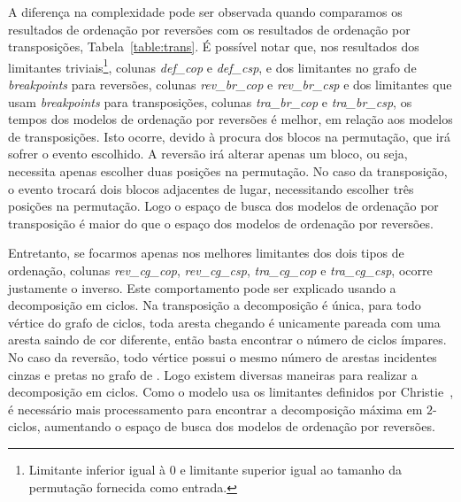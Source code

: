 A diferença na complexidade pode ser observada quando comparamos os
resultados de ordenação por reversões com os resultados de ordenação por
transposições, Tabela~\ref{table:trans}. É possível notar que, nos
resultados dos limitantes triviais\footnote{Limitante inferior igual à
$0$ e limitante superior igual ao tamanho da permutação fornecida como
entrada.}, colunas \textit{def\_cop} e \textit{def\_csp}, e dos
limitantes no grafo de \textit{breakpoints} para reversões, colunas
\textit{rev\_br\_cop} e \textit{rev\_br\_csp} e dos limitantes que usam
\textit{breakpoints} para transposições, colunas \textit{tra\_br\_cop} e
\textit{tra\_br\_csp}, os tempos dos modelos de ordenação por reversões
é melhor, em relação aos modelos de transposições. Isto ocorre, devido à
procura dos blocos na permutação, que irá sofrer o evento escolhido. A
reversão irá alterar apenas um bloco, ou seja, necessita apenas escolher
duas posições na permutação. No caso da transposição, o evento trocará
dois blocos adjacentes de lugar, necessitando escolher três posições na
permutação. Logo o espaço de busca dos modelos de ordenação por
transposição é maior do que o espaço dos modelos de ordenação por
reversões.

Entretanto, se focarmos apenas nos melhores limitantes dos dois tipos de
ordenação, colunas \textit{rev\_cg\_cop}, \textit{rev\_cg\_csp},
\textit{tra\_cg\_cop} e \textit{tra\_cg\_csp}, ocorre justamente o
inverso. Este comportamento pode ser explicado usando a decomposição em
ciclos. Na transposição a decomposição é única, para todo vértice do
grafo de ciclos, toda aresta chegando é unicamente pareada com uma
aresta saindo de cor diferente, então basta encontrar o número de ciclos
ímpares. No caso da reversão, todo vértice possui o mesmo número de
arestas incidentes cinzas e pretas no grafo de \bkp{}. Logo existem
diversas maneiras para realizar a decomposição em ciclos. Como o modelo
usa os limitantes definidos por Christie~\cite{Christie*1998}, é
necessário mais processamento para encontrar a decomposição máxima em
$2$-ciclos, aumentando o espaço de busca dos modelos de ordenação por
reversões.

